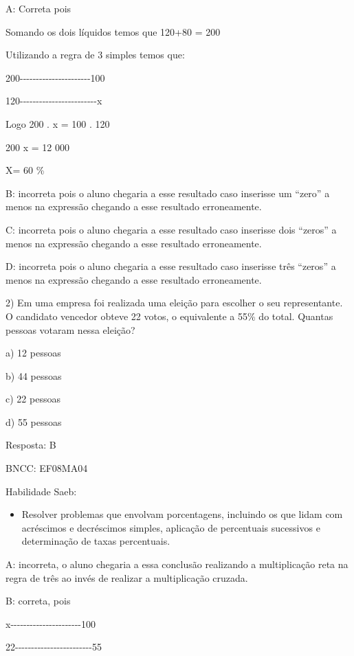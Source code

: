 A: Correta pois

Somando os dois líquidos temos que 120+80 = 200

Utilizando a regra de 3 simples temos que:

200-\/-\/-\/-\/-\/-\/-\/-\/-\/-\/-\/-\/-\/-\/-\/-\/-\/-\/-\/-\/-\/-100

120-\/-\/-\/-\/-\/-\/-\/-\/-\/-\/-\/-\/-\/-\/-\/-\/-\/-\/-\/-\/-\/-\/-\/-x

Logo 200 . x = 100 . 120

200 x = 12 000

X= 60 \%

B: incorreta pois o aluno chegaria a esse resultado caso inserisse um
``zero'' a menos na expressão chegando a esse resultado erroneamente.

C: incorreta pois o aluno chegaria a esse resultado caso inserisse dois
``zeros'' a menos na expressão chegando a esse resultado erroneamente.

D: incorreta pois o aluno chegaria a esse resultado caso inserisse três
``zeros'' a menos na expressão chegando a esse resultado erroneamente.

2) Em uma empresa foi realizada uma eleição para escolher o seu
representante. O candidato vencedor obteve 22 votos, o equivalente a
55\% do total. Quantas pessoas votaram nessa eleição?

a) 12 pessoas

b) 44 pessoas

c) 22 pessoas

d) 55 pessoas

Resposta: B

BNCC: EF08MA04

Habilidade Saeb:

\begin{itemize}
\tightlist
\item
  Resolver problemas que envolvam porcentagens, incluindo os que lidam
  com acréscimos e decréscimos simples, aplicação de percentuais
  sucessivos e determinação de taxas percentuais.
\end{itemize}

A: incorreta, o aluno chegaria a essa conclusão realizando a
multiplicação reta na regra de três ao invés de realizar a multiplicação
cruzada.

B: correta, pois

x-\/-\/-\/-\/-\/-\/-\/-\/-\/-\/-\/-\/-\/-\/-\/-\/-\/-\/-\/-\/-\/-100

22-\/-\/-\/-\/-\/-\/-\/-\/-\/-\/-\/-\/-\/-\/-\/-\/-\/-\/-\/-\/-\/-\/-\/-55

